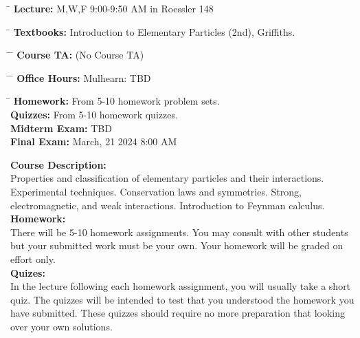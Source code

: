 \documentclass[12pt]{article}
\begin{document}
\noindent
\begin{tabbing}
\hspace*{8em} \= \kill 
\textbf {Lecture:} \> M,W,F 9:00-9:50 AM in Roessler 148 
\end{tabbing}
\noindent
\begin{tabbing}
\hspace*{8em} \= \kill 
\textbf{Textbooks:} \> Introduction to Elementary Particles (2nd), Griffiths.\\
\end{tabbing}
\noindent
\begin{tabbing}
\hspace*{8em}\= \hspace*{10em} \= \kill 
\textbf{Course TA:} \> (No Course TA)
\end{tabbing}
\noindent
\begin{tabbing}
\hspace*{8em}\= \hspace*{10em} \= \kill 
\textbf{Office Hours:}
    \> Mulhearn: \> TBD
\end{tabbing}
\noindent
\begin{tabbing}
\hspace*{12em}\= \kill 
\textbf{Homework:} \> From 5-10 homework problem sets.\\
\textbf{Quizzes:} \> From 5-10 homework quizzes.\\
\textbf{Midterm Exam:} \> TBD\\
\textbf{Final Exam:} \>  March, 21 2024 8:00 AM\\
\end{tabbing}
\noindent
\textbf {Course Description:}\\
Properties and classification of elementary particles and their interactions. Experimental techniques. Conservation laws and symmetries. Strong, electromagnetic, and weak interactions. Introduction to Feynman calculus.\\[3pt]

\noindent
\textbf{Homework:}\\
There will be 5-10 homework assignments.  You may consult with other students but your submitted work must be your own.  Your homework will be graded on effort only.\\[3pt]

\noindent
\textbf{Quizes:}\\
In the lecture following each homework assignment, you will usually take a short quiz.  The quizzes will be intended to test that you understood the homework you have submitted.  These quizzes should require no more preparation that looking over your own solutions.\\[3pt]
\end{document}
